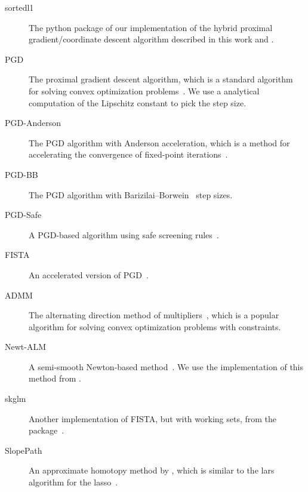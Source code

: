 \documentclass[article]{jss}
\begin{document}
\begin{description}
  \item[sortedl1] The python package of our implementation of the hybrid
        proximal gradient/coordinate descent algorithm described in this work and
        \citet{larsson2023}.
  \item[PGD] The proximal gradient descent algorithm, which is a standard
        algorithm for solving convex optimization problems~\citep{wright2009}. We use a
        analytical computation of the Lipschitz constant to pick the step size.
  \item[PGD-Anderson] The PGD algorithm with Anderson acceleration, which is a
        method for accelerating the convergence of fixed-point
        iterations~\citep{anderson1965,zhang2020}.
  \item[PGD-BB] The PGD algorithm with Barizilai--Borwein~\citep{barzilai1988} step sizes.
  \item[PGD-Safe] A PGD-based algorithm using safe screening rules~\citep{elvira2023}.
  \item[FISTA] An accelerated version of PGD~\citep{beck2009}.
  \item[ADMM] The alternating direction method of
        multipliers~\citep{glowinski1975,boyd2010}, which is a popular algorithm
        for solving convex optimization problems with constraints.
  \item[Newt-ALM] A semi-smooth Newton-based method~\citep{luo2019}. We use the
        implementation of this method from \citet{larsson2023}.
  \item[skglm] Another implementation of FISTA, but with working sets, from the
         package~\citep{bertrand2022}.
  \item[SlopePath] An approximate homotopy method by \citet{dupuis2024},
        which is similar to the lars algorithm for the lasso~\citep{efron2004}.
\end{description}
\end{document}
